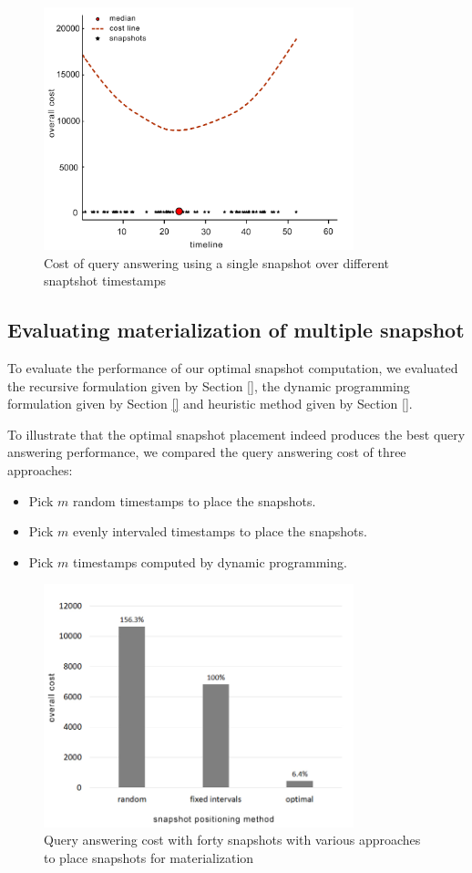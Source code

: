 			\begin{figure}
				\centering
				\includegraphics[width=90mm]{figs/single_snapshot.jpg}
				\caption{Cost of query answering using a single snapshot over different snaptshot timestamps}
				\label{fig:single_snapshot}
			\end{figure} 

		\subsection{Evaluating materialization of multiple snapshot} \label{evaluating_multiple_snapshots}
			To evaluate the performance of our optimal snapshot computation, we evaluated the recursive formulation given
			by Section \ref{}, the dynamic programming formulation given by Section \ref{} and heuristic method given by Section \ref{}. 

			To illustrate that the optimal snapshot placement indeed produces the best query answering performance, we compared the query answering cost of three approaches:
			\begin{itemize}
				\item Pick $m$ random timestamps to place the snapshots.
				\item Pick $m$ evenly intervaled timestamps to place the snapshots.
				\item Pick $m$ timestamps computed by dynamic programming.
			\end{itemize}

			\begin{figure}
				\centering
				\includegraphics[width=90mm]{figs/various_scenarios_cost.jpg}
				\caption{Query answering cost with forty snapshots with various approaches to place snapshots for materialization}
				\label{fig:approaches_cost}
			\end{figure} 

